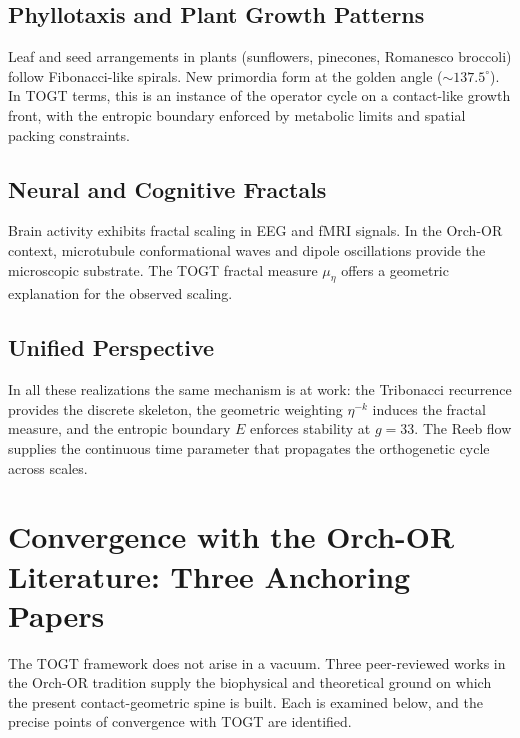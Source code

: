 \documentclass[11pt,a4paper]{article}
\theoremstyle{definition}
\theoremstyle{remark}
\begin{document}
\subsection{Phyllotaxis and Plant Growth Patterns}

Leaf and seed arrangements in plants (sunflowers, pinecones, Romanesco broccoli) follow
Fibonacci-like spirals. New primordia form at the golden angle ($\sim137.5^\circ$). In TOGT
terms, this is an instance of the operator cycle on a contact-like growth front, with the
entropic boundary enforced by metabolic limits and spatial packing constraints.

\subsection{Neural and Cognitive Fractals}

Brain activity exhibits fractal scaling in EEG and fMRI signals. In the Orch-OR context,
microtubule conformational waves and dipole oscillations provide the microscopic substrate. The
TOGT fractal measure $\mu_\eta$ offers a geometric explanation for the observed scaling.

\subsection{Unified Perspective}

In all these realizations the same mechanism is at work: the Tribonacci recurrence provides
the discrete skeleton, the geometric weighting $\eta^{-k}$ induces the fractal measure, and
the entropic boundary $E$ enforces stability at $g=33$. The Reeb flow supplies the continuous
time parameter that propagates the orthogenetic cycle across scales.

\section{Convergence with the Orch-OR Literature: Three Anchoring Papers}
\label{sec:literature}

The TOGT framework does not arise in a vacuum. Three peer-reviewed works in the Orch-OR
tradition supply the biophysical and theoretical ground on which the present contact-geometric
spine is built. Each is examined below, and the precise points of convergence with TOGT are
identified.
\end{document}
